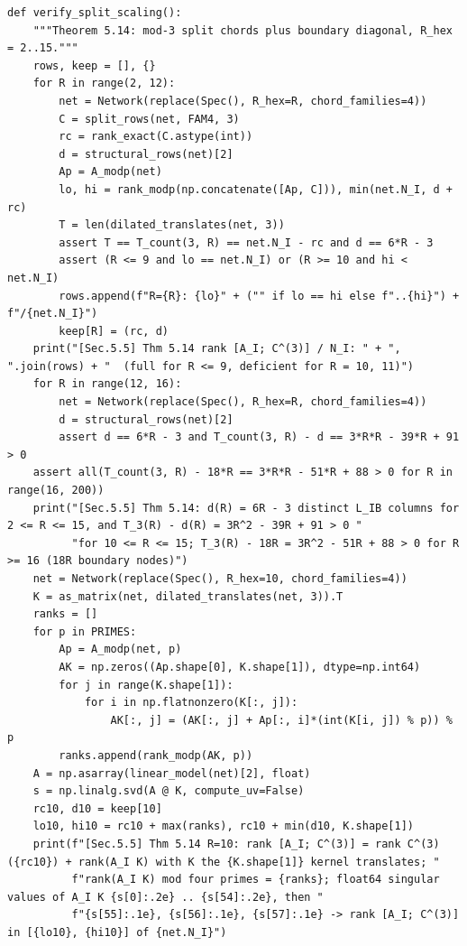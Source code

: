 \documentclass[11pt,a4paper]{article}
\theoremstyle{definition}
\theoremstyle{remark}
\begin{document}
\begin{lstlisting}
def verify_split_scaling():
    """Theorem 5.14: mod-3 split chords plus boundary diagonal, R_hex = 2..15."""
    rows, keep = [], {}
    for R in range(2, 12):
        net = Network(replace(Spec(), R_hex=R, chord_families=4))
        C = split_rows(net, FAM4, 3)
        rc = rank_exact(C.astype(int))
        d = structural_rows(net)[2]
        Ap = A_modp(net)
        lo, hi = rank_modp(np.concatenate([Ap, C])), min(net.N_I, d + rc)
        T = len(dilated_translates(net, 3))
        assert T == T_count(3, R) == net.N_I - rc and d == 6*R - 3
        assert (R <= 9 and lo == net.N_I) or (R >= 10 and hi < net.N_I)
        rows.append(f"R={R}: {lo}" + ("" if lo == hi else f"..{hi}") + f"/{net.N_I}")
        keep[R] = (rc, d)
    print("[Sec.5.5] Thm 5.14 rank [A_I; C^(3)] / N_I: " + ", ".join(rows) + "  (full for R <= 9, deficient for R = 10, 11)")
    for R in range(12, 16):
        net = Network(replace(Spec(), R_hex=R, chord_families=4))
        d = structural_rows(net)[2]
        assert d == 6*R - 3 and T_count(3, R) - d == 3*R*R - 39*R + 91 > 0
    assert all(T_count(3, R) - 18*R == 3*R*R - 51*R + 88 > 0 for R in range(16, 200))
    print("[Sec.5.5] Thm 5.14: d(R) = 6R - 3 distinct L_IB columns for 2 <= R <= 15, and T_3(R) - d(R) = 3R^2 - 39R + 91 > 0 "
          "for 10 <= R <= 15; T_3(R) - 18R = 3R^2 - 51R + 88 > 0 for R >= 16 (18R boundary nodes)")
    net = Network(replace(Spec(), R_hex=10, chord_families=4))
    K = as_matrix(net, dilated_translates(net, 3)).T
    ranks = []
    for p in PRIMES:
        Ap = A_modp(net, p)
        AK = np.zeros((Ap.shape[0], K.shape[1]), dtype=np.int64)
        for j in range(K.shape[1]):
            for i in np.flatnonzero(K[:, j]):
                AK[:, j] = (AK[:, j] + Ap[:, i]*(int(K[i, j]) % p)) % p
        ranks.append(rank_modp(AK, p))
    A = np.asarray(linear_model(net)[2], float)
    s = np.linalg.svd(A @ K, compute_uv=False)
    rc10, d10 = keep[10]
    lo10, hi10 = rc10 + max(ranks), rc10 + min(d10, K.shape[1])
    print(f"[Sec.5.5] Thm 5.14 R=10: rank [A_I; C^(3)] = rank C^(3) ({rc10}) + rank(A_I K) with K the {K.shape[1]} kernel translates; "
          f"rank(A_I K) mod four primes = {ranks}; float64 singular values of A_I K {s[0]:.2e} .. {s[54]:.2e}, then "
          f"{s[55]:.1e}, {s[56]:.1e}, {s[57]:.1e} -> rank [A_I; C^(3)] in [{lo10}, {hi10}] of {net.N_I}")



\end{lstlisting}
\end{document}
